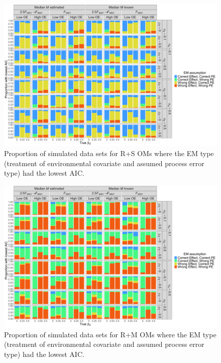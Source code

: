 \documentclass[
  12pt,
]{article}
\begin{document}
\begin{landscape}
\begin{figure}
\begin{center}
\includegraphics[height = \textheight]{aic_RSom}
\end{center}
\caption{Proportion of simulated data sets for R+S OMs where the EM type (treatment of environmental covariate and assumed process error type) had the lowest AIC.}\label{aic_RSom}
\end{figure}
\end{landscape}

\begin{landscape}
\begin{figure}
\begin{center}
\includegraphics[height = \textheight]{aic_RMom}
\end{center}
\caption{Proportion of simulated data sets for R+M OMs where the EM type (treatment of environmental covariate and assumed process error type) had the lowest AIC.}\label{aic_RMom}
\end{figure}
\end{landscape}
\end{document}
